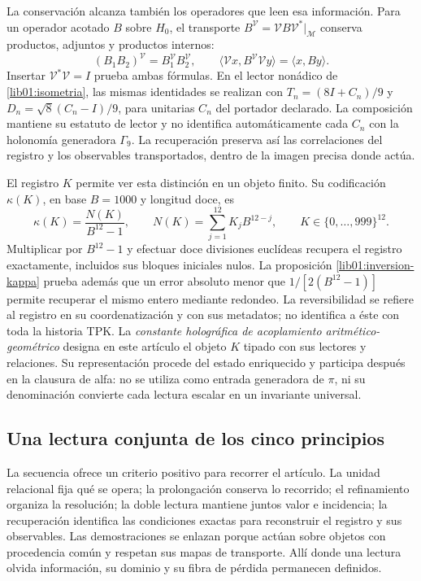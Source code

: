 La conservación alcanza también los operadores que leen esa información.
Para un operador acotado \(B\) sobre \(H_0\), el transporte
\(B^{\mathcal V}=\mathcal VB\mathcal V^*|_{\mathcal M}\) conserva
productos, adjuntos y productos internos:
\[
 (B_1B_2)^{\mathcal V}=B_1^{\mathcal V}B_2^{\mathcal V},\qquad
 \langle\mathcal Vx,B^{\mathcal V}\mathcal Vy\rangle
                       =\langle x,By\rangle.
\]
Insertar \(\mathcal V^*\mathcal V=I\) prueba ambas fórmulas. En el
lector nonádico de \cref{lib01:isometria}, las mismas identidades se
realizan con \(T_n=(8I+C_n)/9\) y
\(D_n=\sqrt8(C_n-I)/9\), para unitarias \(C_n\) del portador
declarado. La composición mantiene su estatuto de lector y no identifica
automáticamente cada \(C_n\) con la holonomía generadora \(\Gamma_9\).
La recuperación preserva así las correlaciones del registro y los
observables transportados, dentro de la imagen precisa donde actúa.

El registro \(K\) permite ver esta distinción en un objeto finito. Su
codificación \(\kappa(K)\), en base \(B=1000\) y longitud doce, es
\[
 \kappa(K)=\frac{N(K)}{B^{12}-1},\qquad
 N(K)=\sum_{j=1}^{12}K_jB^{12-j},\qquad
 K\in\{0,\ldots,999\}^{12}.
\]
Multiplicar por \(B^{12}-1\) y efectuar doce divisiones euclídeas
recupera el registro exactamente, incluidos sus bloques iniciales nulos.
La proposición \cref{lib01:inversion-kappa} prueba además que un error
absoluto menor que \(1/[2(B^{12}-1)]\) permite recuperar el mismo entero
mediante redondeo. La reversibilidad se refiere al registro en su coordenatización y
con sus metadatos; no identifica a éste con toda la historia TPK. La
\emph{constante holográfica de acoplamiento aritmético-geométrico} designa
en este artículo el objeto \(K\) tipado con sus lectores y relaciones. Su
representación procede del estado enriquecido y participa después en la
clausura de alfa: no se utiliza como entrada generadora de \(\pi\), ni
su denominación convierte cada lectura escalar en un invariante universal.

\subsection*{Una lectura conjunta de los cinco principios}

La secuencia ofrece un criterio positivo para recorrer el artículo. La unidad
relacional fija qué se opera; la prolongación conserva lo recorrido; el
refinamiento organiza la resolución; la doble lectura mantiene juntos valor
e incidencia; la recuperación identifica las condiciones exactas para
reconstruir el registro y sus observables. Las demostraciones se enlazan
porque actúan sobre objetos con procedencia común y respetan sus mapas de
transporte. Allí donde una lectura olvida información, su dominio y su
fibra de pérdida permanecen definidos.

